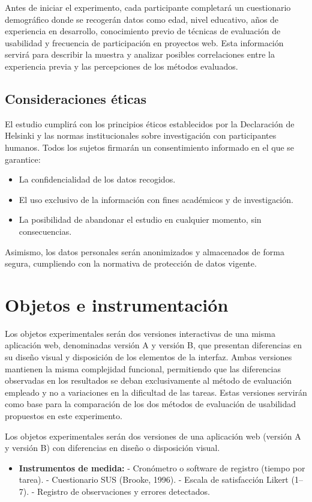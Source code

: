 \documentclass[a4paper,12pt]{report}
\begin{document}
Antes de iniciar el experimento, cada participante completará un cuestionario demográfico donde se recogerán datos como edad, nivel educativo, años de experiencia en desarrollo, conocimiento previo de técnicas de evaluación de usabilidad y frecuencia de participación en proyectos web. Esta información servirá para describir la muestra y analizar posibles correlaciones entre la experiencia previa y las percepciones de los métodos evaluados.

\subsection*{Consideraciones éticas}
El estudio cumplirá con los principios éticos establecidos por la Declaración de Helsinki y las normas institucionales sobre investigación con participantes humanos. Todos los sujetos firmarán un consentimiento informado en el que se garantice:
\begin{itemize}
    \item La confidencialidad de los datos recogidos.
    \item El uso exclusivo de la información con fines académicos y de investigación.
    \item La posibilidad de abandonar el estudio en cualquier momento, sin consecuencias.
\end{itemize}
Asimismo, los datos personales serán anonimizados y almacenados de forma segura, cumpliendo con la normativa de protección de datos vigente.

\section{Objetos e instrumentación}

Los objetos experimentales serán dos versiones interactivas de una misma aplicación web, denominadas versión A y versión B, que presentan diferencias en su diseño visual y 
disposición de los elementos de la interfaz. Ambas versiones mantienen la misma complejidad funcional, permitiendo que las diferencias observadas en los resultados se deban exclusivamente al método 
de evaluación empleado y no a variaciones en la dificultad de las tareas. Estas versiones servirán como base para la comparación de los dos métodos de evaluación de usabilidad propuestos en este experimento. 



Los objetos experimentales serán dos versiones de una aplicación web (versión A y versión B) con diferencias en diseño o disposición visual.  
\begin{itemize}
    \item \textbf{Instrumentos de medida:}  
    - Cronómetro o software de registro (tiempo por tarea).  
    - Cuestionario SUS (Brooke, 1996).  
    - Escala de satisfacción Likert (1--7).  
    - Registro de observaciones y errores detectados.  
\end{itemize}
\end{document}
